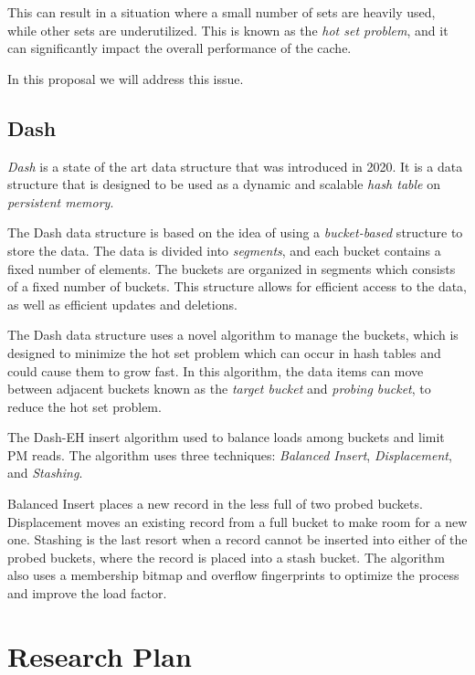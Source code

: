 \documentclass[12pt]{article}
\begin{document}
This can result in a situation where a small number of sets are heavily used, while other sets are underutilized. This is known as the \textit{hot set problem}, and it can significantly impact the overall performance of the cache.

In this proposal we will address this issue.

\subsection{Dash}

\textit{Dash} \cite{dash} is a state of the art data structure that was introduced in 2020. It is a data structure that is designed to be used as a dynamic and scalable \textit{hash table} on \textit{persistent memory}.

The Dash data structure is based on the idea of using a \textit{bucket-based} structure to store the data. The data is divided into \textit{segments}, and each bucket contains a fixed number of elements. The buckets are organized in segments which consists of a fixed number of buckets. This structure allows for efficient access to the data, as well as efficient updates and deletions.

The Dash data structure uses a novel algorithm to manage the buckets, which is designed to minimize the hot set problem which can occur in hash tables and could cause them to grow fast. In this algorithm, the data items can move between adjacent buckets known as the \textit{target bucket} and \textit{probing bucket}, to reduce the hot set problem.

The Dash-EH insert algorithm used to balance loads among buckets and limit PM reads. The algorithm uses three techniques: \textit{Balanced Insert}, \textit{Displacement}, and \textit{Stashing}.

Balanced Insert places a new record in the less full of two probed buckets. Displacement moves an existing record from a full bucket to make room for a new one. Stashing is the last resort when a record cannot be inserted into either of the probed buckets, where the record is placed into a stash bucket. The algorithm also uses a membership bitmap and overflow fingerprints to optimize the process and improve the load factor.

\section{Research Plan}
\end{document}

